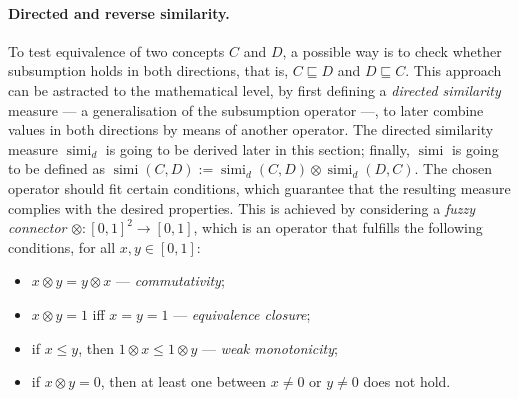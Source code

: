\documentclass[]{llncs}
\DeclareMathOperator{\simi}{simi}
\begin{document}
  \paragraph{Directed and reverse similarity.}
  To test equivalence of two concepts \(C\) and \(D\), a possible way is to check whether subsumption holds in both directions, that is, \(C \sqsubseteq D\) and \(D \sqsubseteq C\).
  This approach can be astracted to the mathematical level, by first defining a \emph{directed similarity} measure --- a generalisation of the subsumption operator ---, to later combine values in both directions by means of another operator.
  The directed similarity measure \(\simi_d\) is going to be derived later in this section; finally, \(\simi\) is going to be defined as \(\simi(C,D) := \simi_d(C,D) \otimes \simi_d(D,C)\).
  The chosen operator should fit certain conditions, which guarantee that the resulting measure complies with the desired properties.
  This is achieved by considering a \emph{fuzzy connector} \(\otimes \colon {[0,1]}^2 \to [0,1]\), which is an operator that fulfills the following conditions, for all \(x, y \in [0,1]\):
  \begin{itemize}
    \item \(x \otimes y = y \otimes x\) --- \emph{commutativity};
    \item \(x \otimes y = 1\) iff \(x = y = 1\) --- \emph{equivalence closure};
    \item if \(x \le y\), then \(1 \otimes x \le 1 \otimes y\) --- \emph{weak monotonicity};
    \item if \(x \otimes y = 0\), then at least one between \(x \ne 0\) or \(y \ne 0\) does not hold.
  \end{itemize}
\end{document}
